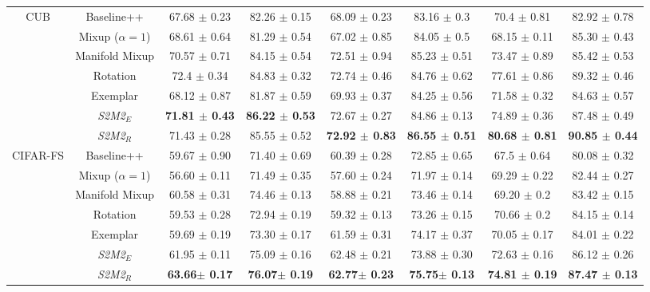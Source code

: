 \documentclass[10pt,twocolumn,letterpaper]{article}
\begin{document}
\begin{table*}[!h]
{\begin{tabular}{|c|c|c|c|c|c|c|c|}
                                
\hline
\multirow{7}{*}{CUB}            & Baseline++ & 67.68 $\pm$ 0.23 & 82.26 $\pm$ 0.15                                 & 68.09 $\pm$ 0.23 & 83.16 $\pm$ 0.3 & 70.4 $\pm$                                  0.81 & 82.92 $\pm$ 0.78 \\
                                & Mixup ($\alpha=1$) & 68.61 $\pm$ 0.64 & 81.29 $\pm$ 0.54 & 67.02 $\pm$ 0.85 & 84.05 $\pm$ 0.5 & 68.15 $\pm$ 0.11 & 85.30 $\pm$ 0.43 \\
                                & Manifold Mixup & 70.57 $\pm$ 0.71 & 84.15 $\pm$ 0.54 & 72.51 $\pm$ 0.94 &  85.23 $\pm$ 0.51 & 73.47 $\pm$ 0.89 & 85.42 $\pm$ 0.53 \\
& Rotation & 72.4 $\pm$ 0.34 & 84.83 $\pm$ 0.32 & 72.74 $\pm$ 0.46 & 84.76 $\pm$ 0.62 & 77.61 $\pm$ 0.86 & 89.32 $\pm$ 0.46 \\
                                & Exemplar& 68.12 $\pm$ 0.87 & 81.87 $\pm$ 0.59 & 69.93 $\pm$ 0.37 & 84.25 $\pm$ 0.56 & 71.58 $\pm$ 0.32 & 84.63 $\pm$ 0.57 \\
& \textit{S2M2$_E$} & \textbf{71.81 $\pm$ 0.43} & \textbf{86.22 $\pm$ 0.53} & 72.67 $\pm$ 0.27 & 84.86 $\pm$ 0.13 & 74.89 $\pm$ 0.36 & 87.48 $\pm$ 0.49\\
                                & \textit{S2M2$_R$}  & 71.43 $\pm$ 0.28 & 85.55 $\pm$ 0.52 & \textbf{72.92 $\pm$ 0.83} & \textbf{86.55 $\pm$ 0.51} & \textbf{80.68 $\pm$ 0.81} & \textbf{90.85 $\pm$ 0.44}\\
\hline
\multirow{7}{*}{CIFAR-FS}       & Baseline++ & 59.67 $\pm$ 0.90 & 71.40 $\pm$ 0.69                                 & 60.39 $\pm$ 0.28 & 72.85 $\pm$ 0.65 & 67.5 $\pm$                                 0.64 & 80.08 $\pm$ 0.32 \\
                                & Mixup ($\alpha=1$) & 56.60 $\pm$ 0.11 & 71.49 $\pm$ 0.35 & 57.60 $\pm$ 0.24 & 71.97 $\pm$ 0.14 & 69.29 $\pm$ 0.22 & 82.44 $\pm$ 0.27 \\
                                & Manifold Mixup & 60.58 $\pm$ 0.31 & 74.46 $\pm$ 0.13 & 58.88 $\pm$ 0.21 & 73.46 $\pm$ 0.14 & 69.20 $\pm$ 0.2 & 83.42 $\pm$ 0.15\\
& Rotation & 59.53 $\pm$ 0.28 & 72.94 $\pm$ 0.19 & 59.32 $\pm$ 0.13 &  73.26 $\pm$ 0.15 & 70.66 $\pm$ 0.2 & 84.15 $\pm$ 0.14 \\
                                & Exemplar  &59.69 $\pm$ 0.19 & 73.30 $\pm$ 0.17 & 61.59 $\pm$ 0.31 & 74.17 $\pm$ 0.37 & 70.05 $\pm$ 0.17 & 84.01 $\pm$ 0.22 \\
& \textit{S2M2$_E$}  & 61.95 $\pm$ 0.11 & 75.09 $\pm$ 0.16 & 62.48 $\pm$ 0.21 & 73.88 $\pm$ 0.30 & 72.63 $\pm$ 0.16 & 86.12 $\pm$ 0.26 \\
                        & \textit{S2M2$_R$}  & \textbf{63.66$\pm$ 0.17} & \textbf{76.07$\pm$ 0.19} & \textbf{62.77$\pm$ 0.23} & \textbf{75.75$\pm$ 0.13} & \textbf{74.81 $\pm$ 0.19} & \textbf{87.47 $\pm$ 0.13}\\
\hline
\end{tabular}}
\label{table:main-results}
\end{table*}
\end{document}
